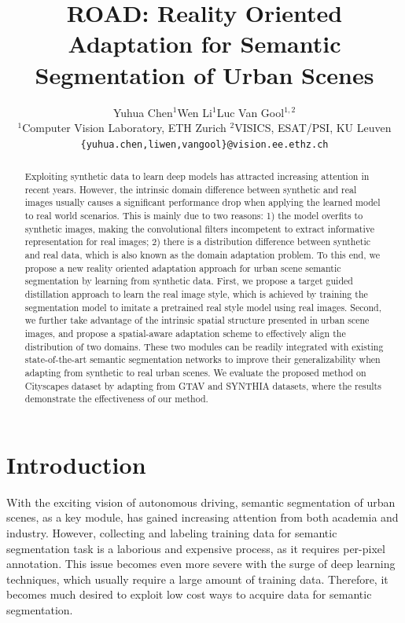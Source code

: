 \documentclass[10pt,twocolumn,letterpaper]{article}
\begin{document}
\title{ROAD: Reality Oriented Adaptation for Semantic Segmentation of Urban Scenes}

\author{Yuhua Chen$^1$\hspace{10mm}Wen Li$^1$\hspace{10mm}Luc Van Gool$^{1,2}$\\[2mm]
$^1$Computer Vision Laboratory, ETH Zurich\hspace{10mm}
$^2$VISICS, ESAT/PSI, KU Leuven\\[-1.5pt]
{\tt\small \{yuhua.chen,liwen,vangool\}@vision.ee.ethz.ch}
}

\maketitle

\begin{abstract}

Exploiting synthetic data to learn deep models has attracted increasing attention in recent years. However, the intrinsic domain difference between synthetic and real images usually causes a significant performance drop when applying the learned model to real world scenarios. This is mainly due to two reasons: 1) the model overfits to synthetic images, making the convolutional filters incompetent to extract informative representation for real images; 2) there is a distribution difference between synthetic and real data, which is also known as the domain adaptation problem. To this end, we propose a new reality oriented adaptation approach for urban scene semantic segmentation by learning from synthetic data. First, we propose a target guided distillation approach to learn the real image style, which is achieved by training the segmentation model to imitate a pretrained real style model using real images. Second, we further take advantage of the intrinsic spatial structure presented in urban scene images, and propose a spatial-aware adaptation scheme to effectively align the distribution of two domains. These two modules can be readily integrated with existing state-of-the-art semantic segmentation networks to improve their generalizability when adapting from synthetic to real urban scenes. We evaluate the proposed method on Cityscapes dataset by adapting from GTAV and SYNTHIA datasets, where the results demonstrate the effectiveness of our method.
\end{abstract}

\vspace{-2mm}
\section{Introduction}
With the exciting vision of autonomous driving, semantic segmentation of urban scenes, as a key module, has gained increasing attention from both academia and industry. However, collecting and labeling training data for semantic segmentation task is a laborious and expensive process, as it requires per-pixel annotation. This issue becomes even more severe with the surge of deep learning techniques, which usually require a large amount of training data. Therefore, it becomes much desired to exploit low cost ways to acquire data for semantic segmentation.
\end{document}
